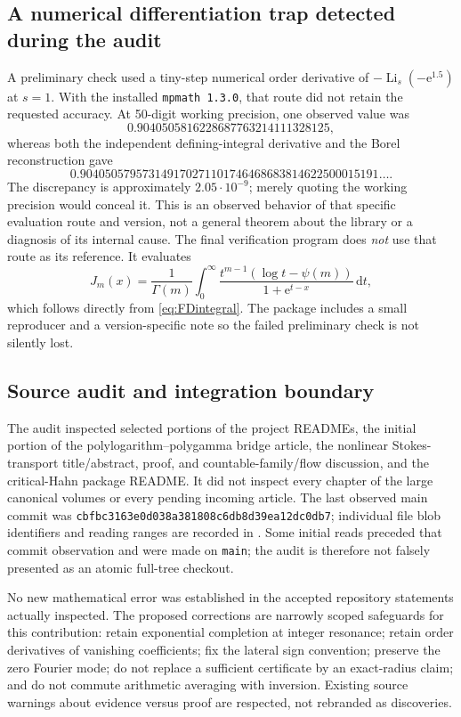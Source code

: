 \documentclass[11pt,a4paper]{article}
\theoremstyle{definition}\newtheorem{definition}[theorem]{Definition}
\theoremstyle{remark}\newtheorem{remark}[theorem]{Remark}
\newcommand{\Li}{\operatorname{Li}}
\newcommand{\dd}{\,\mathrm d}
\newcommand{\ee}{\mathrm e}
\numberwithin{equation}{section}
\begin{document}
\subsection{A numerical differentiation trap detected during the audit}

A preliminary check used a tiny-step numerical order derivative of
$-\Li_s(-\ee^{1.5})$ at $s=1$. With the installed \texttt{mpmath 1.3.0},
that route did not retain the requested accuracy. At 50-digit working
precision, one observed value was
\[
 0.9040505816228687763214111328125,
\]
whereas both the independent defining-integral derivative and the Borel
reconstruction gave
\[
 0.904050579573149170271101746468683814622500015191\ldots.
\]
The discrepancy is approximately $2.05\cdot10^{-9}$; merely quoting the
working precision would conceal it. This is an observed behavior of that
specific evaluation route and version, not a general theorem about the
library or a diagnosis of its internal cause. The final verification
program does \emph{not} use that route as its reference. It evaluates
\begin{equation}\label{eq:independent-jet-integral}
 J_m(x)=\frac1{\Gamma(m)}\int_0^\infty
    \frac{t^{m-1}(\log t-\psi(m))}{1+\ee^{t-x}}\dd t,
\end{equation}
which follows directly from \eqref{eq:FDintegral}. The package includes a
small reproducer and a version-specific note so the failed preliminary
check is not silently lost.

\subsection{Source audit and integration boundary}

The audit inspected selected portions of the project READMEs, the initial portion of the
polylogarithm--polygamma bridge article, the nonlinear Stokes-transport
title/abstract, proof, and countable-family/flow discussion, and the critical-Hahn
package README. It did not inspect every chapter of the large canonical
volumes or every pending incoming article. The last observed main commit
was \texttt{cbfbc3163e0d038a381808c6db8d39ea12dc0db7}; individual file
blob identifiers and reading ranges are recorded in .
Some initial reads preceded that commit observation and were made on
\texttt{main}; the audit is therefore not falsely presented as an atomic
full-tree checkout.

No new mathematical error was established in the accepted repository
statements actually inspected. The proposed corrections are narrowly
scoped safeguards for this contribution: retain exponential completion
at integer resonance; retain order derivatives of vanishing coefficients;
fix the lateral sign convention; preserve the zero Fourier mode; do not
replace a sufficient certificate by an exact-radius claim; and do not
commute arithmetic averaging with inversion. Existing source warnings
about evidence versus proof are respected, not rebranded as discoveries.
\end{document}

